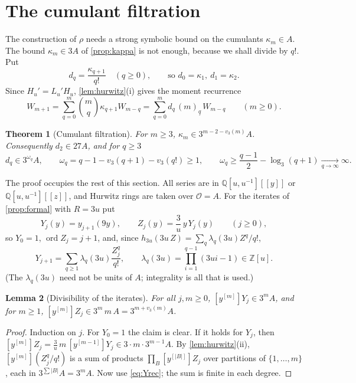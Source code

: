 \documentclass[11pt,reqno]{amsart}
\newtheorem{theorem}{Theorem}[section]
\newtheorem{lemma}[theorem]{Lemma}
\theoremstyle{definition}
\theoremstyle{remark}
\theoremstyle{plain}
\newcommand{\Z}{\mathbb Z}
\newcommand{\Q}{\mathbb Q}
\newcommand{\ord}{\operatorname{ord}}
\newcommand{\fall}[2]{(#1)_{\underline{#2}}}
\newcommand{\hy}[1]{[y^{[#1]}]}
\begin{document}
\section{The cumulant filtration}\label{sec:cumulants}

The construction of $\rho$ needs a strong symbolic bound on the cumulants $\kappa_m\in A$. The bound $\kappa_m\in3A$ of \cref{prop:kappa} is not enough, because we shall divide by $q!$. Put
\[
d_q=\frac{\kappa_{q+1}}{q!}\quad(q\ge0),\qquad\text{so }d_0=\kappa_1,\ d_1=\kappa_2 .
\]
Since $H_u'=L_u'H_u$, \cref{lem:hurwitz}(i) gives the moment recurrence
\begin{equation}\label{eq:momrec}
W_{m+1}=\sum_{q=0}^m\binom mq\kappa_{q+1}W_{m-q}=\sum_{q=0}^md_q\,\fall mq\,W_{m-q}\qquad(m\ge0).
\end{equation}

\begin{theorem}[Cumulant filtration]\label{thm:filtration}
For $m\ge3$, $\kappa_m\in3^{m-2-v_3(m)}A$. Consequently $d_2\in27A$, and for $q\ge3$
\[
d_q\in3^{\omega_q}A,\qquad \omega_q=q-1-v_3(q+1)-v_3(q!)\ge1,\qquad \omega_q\ge\frac{q-1}2-\log_3(q+1)\xrightarrow[q\to\infty]{}\infty .
\]
\end{theorem}

The proof occupies the rest of this section. All series are in $\Q[u,u^{-1}][[y]]$ or $\Q[u,u^{-1}][[z]]$, and Hurwitz rings are taken over $\mathcal O=A$. For the iterates of \cref{prop:formal} with $R=3u$ put
\[
Y_j(y)=y_{j+1}(9y),\qquad Z_j(y)=\frac3u\,y\,Y_j(y)\qquad(j\ge0),
\]
so $Y_0=1$, $\ord Z_j=j+1$, and, since $h_{3u}(3u\,Z)=\sum_q\lambda_q(3u)Z^q/q!$,
\begin{equation}\label{eq:Yrec}
Y_{j+1}=\sum_{q\ge1}\lambda_q(3u)\frac{Z_j^q}{q!},\qquad\lambda_q(3u)=\prod_{i=1}^{q-1}(3ui-1)\in\Z[u].
\end{equation}
(The $\lambda_q(3u)$ need not be units of $A$; integrality is all that is used.)

\begin{lemma}[Divisibility of the iterates]\label{lem:iterdiv}
For all $j,m\ge0$, $\hy mY_j\in3^mA$, and for $m\ge1$, $\hy mZ_j\in3^m\,m\,A=3^{m+v_3(m)}A$.
\end{lemma}

\begin{proof}
Induction on $j$. For $Y_0=1$ the claim is clear. If it holds for $Y_j$, then $\hy mZ_j=\frac3u\,m\,\hy{m-1}Y_j\in3\cdot m\cdot3^{m-1}A$. By \cref{lem:hurwitz}(ii), $\hy m(Z_j^q/q!)$ is a sum of products $\prod_B\hy{|B|}Z_j$ over partitions of $\{1,\dots,m\}$, each in $3^{\sum|B|}A=3^mA$. Now use \eqref{eq:Yrec}; the sum is finite in each degree.
\end{proof}
\end{document}
